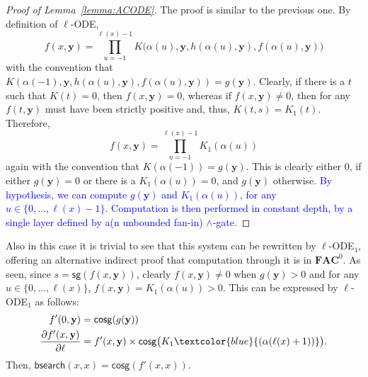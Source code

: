 \documentclass[11pt, oneside]{article}
\newcommand{\fun}[1]{\mathsf{#1}}
\newcommand{\AC}{\mathbf{FAC}}
\newcommand{\tu}[1]{\mathbf{#1}}
\theoremstyle{definition}
\begin{document}
{\begin{proof}[Proof of Lemma~\ref{lemma:ACODE}]
    The proof is similar to the previous one.
    By definition of $\ell$-ODE,
    $$
    f(x, \tu y) = \prod^{\ell(x)-1}_{u=-1} K\big(\alpha (u), \tu y, h(\alpha(u), \tu y), f(\alpha(u), \tu y)\big)
    $$
    with the convention that $K(\alpha(-1), \tu y, h(\alpha(u), \tu y), f(\alpha(u), \tu y))=g(\tu y)$.
    Clearly, if there is a $t$ such that $K(t)= 0$, then $f(x, \tu y)=0$, whereas if $f(x, \tu y)\neq 0$, then for any $f(t, \tu y)$ must have been strictly positive and, thus, $K(t,s)=K_1(t)$.
    Therefore,
    $$
        f(x, \tu y) = \prod^{\ell(x)-1}_{u=-1} K_1(\alpha(u))
    $$
    again with the convention that $K(\alpha(-1))=g(\tu y)$.
    This is clearly either 0, if either $g(\tu y)=0$ or there is a $K_1(\alpha(u))=0$, and $g(\tu y)$ otherwise.
    \textcolor{blue}{By hypothesis, we can compute $g(\tu y)$ and $K_1(\alpha(u))$, for any $u \in \{0, \dots, \ell(x)-1\}$. Computation is then performed in constant depth, by a single layer defined by a(n unbounded fan-in) $\wedge$-gate.}
\end{proof}

\noindent
\marginpar{\footnotesize{\textcolor{red}{A bit pleonastic but I don't know which approach is more insightful/elegant}}}
Also in this case it is trivial to see that this system can be rewritten by $\ell$-ODE$_1$, offering an alternative indirect proof that computation through it is in $\AC^0$.
%
As seen, since $s=\fun{sg}(f(x, \tu y))$, clearly $f(x, \tu y) \neq 0$ when $g(\tu y)>0$ and for any $u\in \{0, \dots, \ell(x)\}$, $f(x, \tu y)=K_1(\alpha(u))>0$.
%
This can be expressed by $\ell$-ODE$_1$ as follows:
\begin{align*}
    f'(0, \tu y) &= \fun{cosg}(g(\tu y)) \\
    \frac{\partial f'(x, \tu y)}{\partial \ell} &= f'(x, \tu y) \times \fun{cosg}\big(K_1\textcolor{blue}{(\alpha(\ell(x) + 1))}\big).
\end{align*}
Then, $\fun{bsearch}(x,x)=\fun{cosg}(f'(x,x))$.

}
\end{document}
